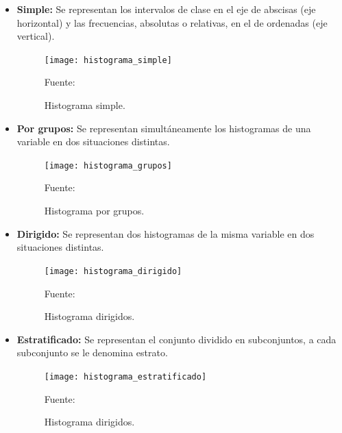 \begin{itemize}
	\item \textbf{Simple:} Se representan los intervalos de clase en el eje de abscisas (eje horizontal) y las frecuencias, absolutas o relativas, en el de ordenadas (eje vertical).
	
	\begin{figure}[ht]
		\begin{center}
			\texttt{[image: histograma\_simple]}
		\end{center}
		\begin{center}
			\vskip -0.5cm
			\caption{\small{Histograma simple.}}
			{\small{Fuente: \citep{histograma_tipos}}}
		\end{center}
	\end{figure}
	
	\item \textbf{Por grupos:} Se representan simultáneamente los histogramas de una variable en dos situaciones distintas.
	
	\begin{figure}[ht]
		\begin{center}
			\texttt{[image: histograma\_grupos]}
		\end{center}
		\begin{center}
			\vskip -0.5cm
			\caption{\small{Histograma por grupos.}}
			{\small{Fuente: \citep{histograma_tipos}}}
		\end{center}
	\end{figure}
	

	\item \textbf{Dirigido:} Se representan dos histogramas de la misma variable en dos situaciones distintas.
	
	\begin{figure}[ht]
		\begin{center}
			\texttt{[image: histograma\_dirigido]}
		\end{center}
		\begin{center}
			\vskip -0.5cm
			\caption{\small{Histograma dirigidos.}}
			{\small{Fuente: \citep{histograma_tipos}}}
		\end{center}
	\end{figure}
	
	\item \textbf{Estratificado:} Se representan el conjunto dividido en subconjuntos, a cada subconjunto se le denomina estrato.
	
	\begin{figure}[ht]
		\begin{center}
			\texttt{[image: histograma\_estratificado]}
		\end{center}
		\begin{center}
			\vskip -0.5cm
			\caption{\small{Histograma dirigidos.}}
			{\small{Fuente: \citep{histograma_tipos}}}
		\end{center}
	\end{figure}

\end{itemize}

